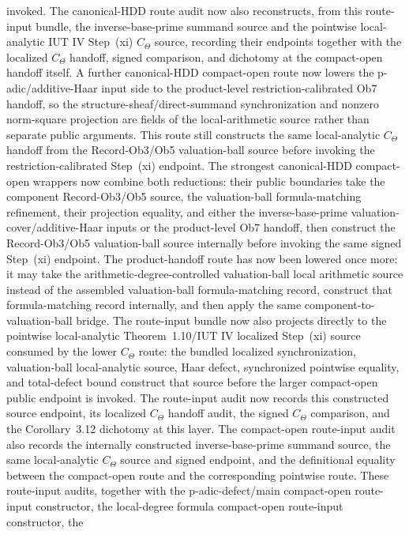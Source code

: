 \documentclass[11pt]{article}
\newcommand{\IUT}{IUT}
\theoremstyle{plain}
\theoremstyle{definition}
\theoremstyle{remark}
\begin{document}
invoked.  The canonical-HDD route audit now also reconstructs, from this
route-input bundle, the inverse-base-prime summand source and the pointwise
local-analytic \IUT{} IV Step~(xi) \(C_\Theta\) source, recording their
endpoints together with the localized \(C_\Theta\) handoff, signed comparison,
and dichotomy at the compact-open handoff itself.  A further canonical-HDD
compact-open route now lowers the p-adic/additive-Haar input side to the
product-level restriction-calibrated Ob7 handoff, so the
structure-sheaf/direct-summand synchronization and nonzero norm-square
projection are fields of the local-arithmetic source rather than separate
public arguments.  This route still constructs the same local-analytic
\(C_\Theta\) handoff from the Record-Ob3/Ob5 valuation-ball source before
invoking the restriction-calibrated Step~(xi) endpoint.  The strongest
canonical-HDD compact-open wrappers now combine both reductions: their public
boundaries take the component Record-Ob3/Ob5 source, the valuation-ball
formula-matching refinement, their projection equality, and either the
inverse-base-prime valuation-cover/additive-Haar inputs or the product-level
Ob7 handoff, then construct the Record-Ob3/Ob5 valuation-ball source internally
before invoking the same signed Step~(xi) endpoint.  The product-handoff route
has now been lowered once more: it may take the arithmetic-degree-controlled
valuation-ball local arithmetic source instead of the assembled valuation-ball
formula-matching record, construct that formula-matching record internally, and
then apply the same component-to-valuation-ball bridge.
The route-input bundle now also projects directly to the pointwise
local-analytic Theorem~1.10/\IUT{} IV localized Step~(xi) source consumed by
the lower \(C_\Theta\) route: the bundled localized synchronization,
valuation-ball local-analytic source, Haar defect, synchronized pointwise
equality, and total-defect bound construct that source before the larger
compact-open public endpoint is invoked.  The route-input audit now records
this constructed source endpoint, its localized \(C_\Theta\) handoff audit,
the signed \(C_\Theta\) comparison, and the Corollary~3.12 dichotomy at this
layer.  The compact-open route-input audit also records the internally
constructed inverse-base-prime summand source, the same local-analytic
\(C_\Theta\) source and signed endpoint, and the definitional equality between
the compact-open route and the corresponding pointwise route.  These route-input
audits, together with the p-adic-defect/main compact-open route-input
constructor, the local-degree formula compact-open route-input constructor, the
\end{document}

